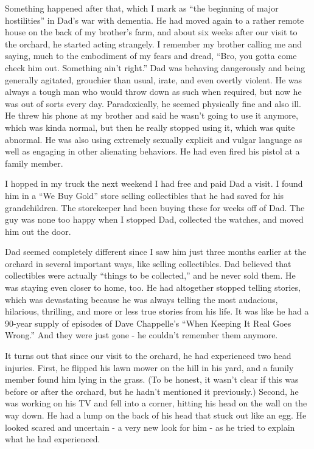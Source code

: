 \documentclass{article}
\begin{document}
Something happened after that, which I mark as ``the beginning of major hostilities'' in Dad's war with dementia. He had moved again to a rather remote house on the back of my brother's farm, and about six weeks after our visit to the orchard, he started acting strangely. I remember my brother calling me and saying, much to the embodiment of my fears and dread, ``Bro, you gotta come check him out. Something ain't right.'' Dad was behaving dangerously and being generally agitated, grouchier than usual, irate, and even overtly violent. He was always a tough man who would throw down as such when required, but now he was out of sorts every day. Paradoxically, he seemed physically fine and also ill. He threw his phone at my brother and said he wasn't going to use it anymore, which was kinda normal, but then he really stopped using it, which was quite abnormal. He was also using extremely sexually explicit and vulgar language as well as engaging in other alienating behaviors. He had even fired his pistol at a family member.

I hopped in my truck the next weekend I had free and paid Dad a visit. I found him in a ``We Buy Gold'' store selling collectibles that he had saved for his grandchildren. The storekeeper had been buying these for weeks off of Dad. The guy was none too happy when I stopped Dad, collected the watches, and moved him out the door.

Dad seemed completely different since I saw him just three months earlier at the orchard in several important ways, like selling collectibles. Dad believed that collectibles were actually ``things to be collected,'' and he never sold them. He was staying even closer to home, too. He had altogether stopped telling stories, which was devastating because he was always telling the most audacious, hilarious, thrilling, and more or less true stories from his life. It was like he had a 90-year supply of episodes of Dave Chappelle's ``When Keeping It Real Goes Wrong.'' And they were just gone - he couldn't remember them anymore.

It turns out that since our visit to the orchard, he had experienced two head injuries. First, he flipped his lawn mower on the hill in his yard, and a family member found him lying in the grass. (To be honest, it wasn't clear if this was before or after the orchard, but he hadn't mentioned it previously.) Second, he was working on his TV and fell into a corner, hitting his head on the wall on the way down. He had a lump on the back of his head that stuck out like an egg. He looked scared and uncertain - a very new look for him - as he tried to explain what he had experienced. 
\end{document}
